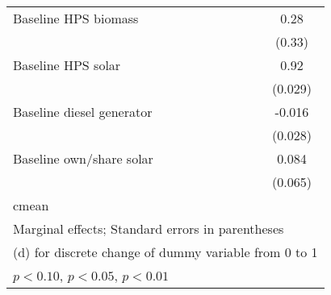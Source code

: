 \begin{table}[htbp]
\begin{tabular*}{1\hsize}{@{\hskip\tabcolsep\extracolsep\fill}l*{5}{c}}
Baseline HPS biomass&                  &                  &                  &                  &     0.28         \\
                &                  &                  &                  &                  &   (0.33)         \\
Baseline HPS solar&                  &                  &                  &                  &     0.92\sym{***}\\
                &                  &                  &                  &                  &  (0.029)         \\
Baseline diesel generator&                  &                  &                  &                  &   -0.016         \\
                &                  &                  &                  &                  &  (0.028)         \\
Baseline own/share solar&                  &                  &                  &                  &    0.084         \\
                &                  &                  &                  &                  &  (0.065)         \\
\midrule
cmean           &                  &                  &                  &                  &                  \\
\bottomrule
\multicolumn{6}{l}{\footnotesize Marginal effects; Standard errors in parentheses}\\
\multicolumn{6}{l}{\footnotesize  (d) for discrete change of dummy variable from 0 to 1}\\
\multicolumn{6}{l}{\footnotesize \sym{*} \(p<0.10\), \sym{**} \(p<0.05\), \sym{***} \(p<0.01\)}\\
\end{tabular*}
\end{table}
